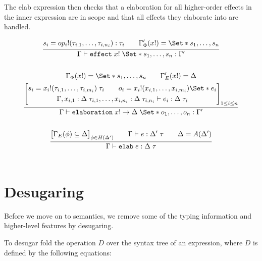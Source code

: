 The elab expression then checks that a elaboration for all higher-order effects in the inner expression are in scope and that all effects they elaborate into are handled.
\\

\begin{gather*}
    \infer{
        \Gamma \vdash \kw{effect}\;x!\;\S{s_1, \dots, s_n}: \Gamma'
    }{
        s_i = op_i!(\tau_{i,1}, \dots, \tau_{i,n_i}): \tau_i
        \qquad
        \Gamma'_\Phi(x!) = \S{s_1, \dots, s_n}
    }
    \\\\
    \infer{
        \Gamma \vdash \elaboration\;x! \to \Delta\;\S{o_1, \dots, o_n} : \Gamma'
    }{
        \Gamma_\Phi(x!) = \S{s_1, \dots, s_n}
        \qquad
        \Gamma'_E(x!) = \Delta
        \\
        \left[
            \begin{gathered}
                s_i = x_i!(\tau_{i,1}, \dots, \tau_{i,m_i})\;\tau_i \qquad o_i = x_i!(x_{i,1}, \dots, x_{i,m_i}) \S{ e_i }
                \\
                \Gamma,x_{i,1}: \Delta\;\tau_{i,1},\dots,x_{i,n_i}: \Delta\;\tau_{i,n_i} \vdash 
                e_i : \Delta\;\tau_i
            \end{gathered}
        \right]_{1\leq i \leq n}
            }
    \\\\
    \infer{
        \Gamma \vdash \elab\;e : \Delta\;\tau
    }{
        \big[
            \Gamma_E(\phi) \subseteq \Delta
        \big]_{\phi \in H(\Delta')}
        \qquad
        \Gamma \vdash e : \Delta'\;\tau
        \qquad
        \Delta = A(\Delta')
    }
    \\\\
\end{gather*}

\section{Desugaring}

Before we move on to semantics, we remove some of the typing information and higher-level features by desugaring.

To desugar fold the operation $D$ over the syntax tree of an expression, where $D$ is defined by the following equations:

